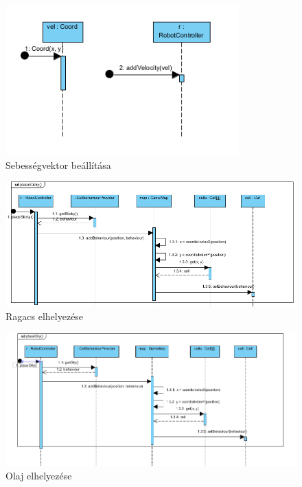 \begin{figure}[!htbp]
\begin{center}
	\includegraphics[width=90mm, center]{./chapters/chapter03/velocity.png}
	\caption{Sebességvektor beállítása}
\end{center}
\end{figure}



\begin{figure}[!htbp]
	\begin{center}
		\includegraphics[width=\textwidth, center]{./chapters/chapter03/sticky.png}
		\caption{Ragacs elhelyezése}
	\end{center}
\end{figure}

\begin{figure}[!htbp]
	\begin{center}
		\includegraphics[width=\textwidth, center]{./chapters/chapter03/oily.png}
		\caption{Olaj elhelyezése}
	\end{center}
\end{figure}

